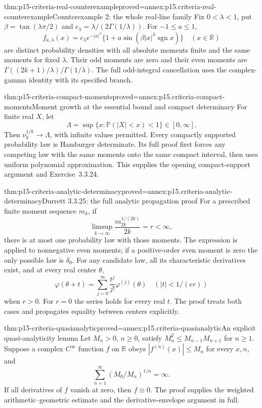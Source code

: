 \begin{hbtheorem}{thm:p15-criteria-real-counterexample}{proved=annex:p15.criteria-real-counterexample}{Counterexample 2: the whole real-line family}
Fix \(0<\lambda<1\), put \(\beta=\tan(\lambda\pi/2)\) and
\(c_\lambda=\lambda/(2\Gamma(1/\lambda))\).
For \(-1\leq a\leq1\),
\[
 f_{a,\lambda}(x)=c_\lambda e^{-|x|^\lambda}
       \{1+a\sin(\beta|x|^\lambda\operatorname{sgn}x)\}
                                      \quad(x\in\mathbb R)
\]
are distinct probability densities with all absolute moments
finite and the same moments for fixed \(\lambda\).
Their odd moments are zero and their even moments are
\(\Gamma((2k+1)/\lambda)/\Gamma(1/\lambda)\).
The full odd-integral cancellation uses the complex-gamma
identity with its specified branch.
\end{hbtheorem}

\begin{hbtheorem}{thm:p15-criteria-compact-moments}{proved=annex:p15.criteria-compact-moments}{Moment growth at the essential bound and compact determinacy}
For finite real \(X\), let
\[
 \Lambda=\sup\{x:\mathbb P(|X|<x)<1\}\in[0,\infty].
\]
Then \(\nu_k^{1/k}\to\Lambda\), with infinite values permitted.
Every compactly supported probability law is Hamburger
determinate. Its full proof first forces any competing law
with the same moments onto the same compact interval, then
uses uniform polynomial approximation.
This supplies the opening compact-support argument and
Exercise~3.3.24.
\end{hbtheorem}

\begin{hbtheorem}{thm:p15-criteria-analytic-determinacy}{proved=annex:p15.criteria-analytic-determinacy}{Durrett 3.3.25: the full analytic propagation proof}
For a prescribed finite moment sequence \(m_k\), if
\[
 \limsup_{k\to\infty}\frac{m_{2k}^{1/(2k)}}{2k}
                  =r<\infty,
\]
there is at most one probability law with those moments.
The expression is applied to nonnegative even moments;
if a positive-order even moment is zero the only possible
law is \(\delta_0\).
For any candidate law, all its characteristic derivatives
exist, and at every real center \(\theta\),
\[
 \varphi(\theta+t)
    =\sum_{j=0}^\infty \frac{t^j}{j!}\varphi^{(j)}(\theta)
                  \quad(|t|<1/(er))
\]
when \(r>0\). For \(r=0\) the series holds for every real
\(t\). The proof treats both cases and propagates equality
between centers explicitly.
\end{hbtheorem}

\begin{hblemma}{thm:p15-criteria-quasianalytic}{proved=annex:p15.criteria-quasianalytic}{An explicit quasi-analyticity lemma}
Let \(M_n>0\), \(n\geq0\), satisfy
\(M_n^2\leq M_{n-1}M_{n+1}\) for \(n\geq1\).
Suppose a complex \(C^\infty\) function \(f\) on \(\mathbb R\)
obeys \(|f^{(n)}(x)|\leq M_n\) for every \(x,n\), and
\[
 \sum_{n=1}^\infty (M_0/M_n)^{1/n}=\infty.
\]
If all derivatives of \(f\) vanish at zero, then \(f\equiv0\).
The proof supplies the weighted arithmetic--geometric
estimate and the derivative-envelope argument in full.
\end{hblemma}

